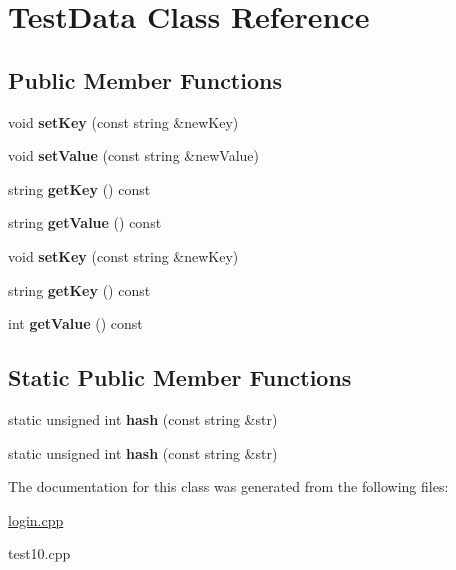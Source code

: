 \hypertarget{class_test_data}{\section{Test\+Data Class Reference}
\label{class_test_data}
}
\subsection*{Public Member Functions}
\begin{DoxyCompactItemize}
\item 
\hypertarget{class_test_data_a72cb0d5febcf77e8a6dd494fa6dff411}{void {\bfseries set\+Key} (const string \&new\+Key)}\label{class_test_data_a72cb0d5febcf77e8a6dd494fa6dff411}

\item 
\hypertarget{class_test_data_ac7fe71dc8c3eda2242e443d22523e286}{void {\bfseries set\+Value} (const string \&new\+Value)}\label{class_test_data_ac7fe71dc8c3eda2242e443d22523e286}

\item 
\hypertarget{class_test_data_ae20d0a4c5fba891d728c68ac4ec79654}{string {\bfseries get\+Key} () const }\label{class_test_data_ae20d0a4c5fba891d728c68ac4ec79654}

\item 
\hypertarget{class_test_data_af33e667b6962f8a351f7a660a1a24c5e}{string {\bfseries get\+Value} () const }\label{class_test_data_af33e667b6962f8a351f7a660a1a24c5e}

\item 
\hypertarget{class_test_data_a72cb0d5febcf77e8a6dd494fa6dff411}{void {\bfseries set\+Key} (const string \&new\+Key)}\label{class_test_data_a72cb0d5febcf77e8a6dd494fa6dff411}

\item 
\hypertarget{class_test_data_ae20d0a4c5fba891d728c68ac4ec79654}{string {\bfseries get\+Key} () const }\label{class_test_data_ae20d0a4c5fba891d728c68ac4ec79654}

\item 
\hypertarget{class_test_data_af33e667b6962f8a351f7a660a1a24c5e}{int {\bfseries get\+Value} () const }\label{class_test_data_af33e667b6962f8a351f7a660a1a24c5e}

\end{DoxyCompactItemize}
\subsection*{Static Public Member Functions}
\begin{DoxyCompactItemize}
\item 
\hypertarget{class_test_data_a55f0e2851aa330be9921303107982f98}{static unsigned int {\bfseries hash} (const string \&str)}\label{class_test_data_a55f0e2851aa330be9921303107982f98}

\item 
\hypertarget{class_test_data_ac38bf2161ad472cfa80703a87e7eda8a}{static unsigned int {\bfseries hash} (const string \&str)}\label{class_test_data_ac38bf2161ad472cfa80703a87e7eda8a}

\end{DoxyCompactItemize}


The documentation for this class was generated from the following files\+:\begin{DoxyCompactItemize}
\item 
\hyperlink{login_8cpp}{login.\+cpp}\item 
test10.\+cpp\end{DoxyCompactItemize}
